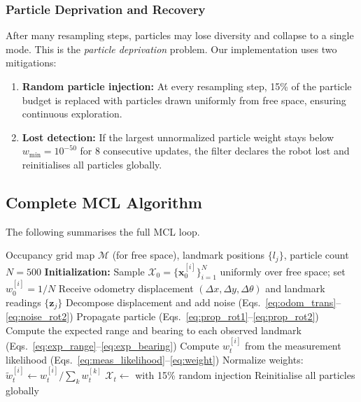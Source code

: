 \documentclass[12pt, a4paper]{article}
\begin{document}
\subsubsection{Particle Deprivation and Recovery}
After many resampling steps, particles may lose diversity and collapse to a single mode.  This is the \textit{particle deprivation} problem.  Our implementation uses two mitigations:
\begin{enumerate}[nosep]
  \item \textbf{Random particle injection:} At every resampling step, 15\% of the particle budget is replaced with particles drawn uniformly from free space, ensuring continuous exploration.
  \item \textbf{Lost detection:} If the largest unnormalized particle weight stays below \(w_{\min} = 10^{-50}\) for 8 consecutive updates, the filter declares the robot lost and reinitialises all particles globally.
\end{enumerate}

\subsection{Complete MCL Algorithm}
\label{subsec:mcl_algo}
The following summarises the full MCL loop.

\begin{algorithm}[H]
\caption{Monte Carlo Localization (MCL)}
\label{alg:mcl}
\begin{algorithmic}[1]
\Require Occupancy grid map $\mathcal{M}$ (for free space), landmark positions $\{l_j\}$,\; particle count $N = 500$
\State \textbf{Initialization:} Sample $\mathcal{X}_0 = \{\mathbf{x}_0^{[i]}\}_{i=1}^{N}$ uniformly over free space; set $w_0^{[i]} = 1/N$
  \State Receive odometry displacement $(\Delta x, \Delta y, \Delta\theta)$ and landmark readings $\{\mathbf{z}_j\}$
   
    \State Decompose displacement and add noise (Eqs.~\eqref{eq:odom_trans}--\eqref{eq:noise_rot2})
    \State Propagate particle (Eqs.~\eqref{eq:prop_rot1}--\eqref{eq:prop_rot2})
  \EndFor
   
    \State Compute the expected range and bearing to each observed landmark (Eqs.~\eqref{eq:exp_range}--\eqref{eq:exp_bearing})
    \State Compute $w_t^{[i]}$ from the measurement likelihood (Eqs.~\eqref{eq:meas_likelihood}--\eqref{eq:weight})
  \EndFor
  \State Normalize weights: $\tilde{w}_t^{[i]} \gets w_t^{[i]} / \sum_k w_t^{[k]}$
  \State $\mathcal{X}_t \gets$  with 15\% random injection 
   
    \State Reinitialise all particles globally
  \EndIf
\EndFor
\end{algorithmic}
\end{algorithm}
\end{document}
